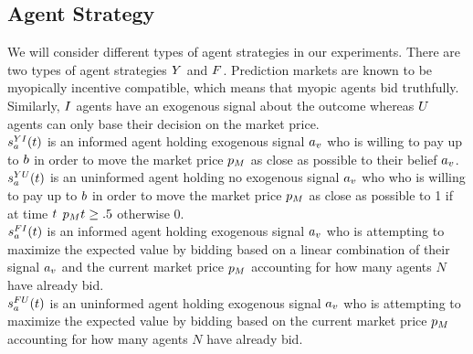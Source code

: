 \subsection{Agent Strategy}
We will consider different types of agent strategies in our experiments. There are two types of agent strategies  $Y$ and  $F$. Prediction markets are known to be myopically incentive compatible, which means that myopic agents bid truthfully. Similarly,  $I$ agents have an exogenous signal about the outcome whereas  $U$ agents can only base their decision on the market price. \\

$s^{YI}_a(t)$ is an informed agent holding exogenous signal $a_v$ who is willing to pay up to $b$ in order to move the market price $p_M$ as close as possible to their belief $a_v$. \\

$s^{YU}_a(t)$ is an uninformed agent holding no exogenous signal $a_v$ who who is willing to pay up to $b$ in order to move the market price $p_M$ as close as possible to 1 if at time $t$ $p_Mt \ge .5$ otherwise 0. \\

$s^{FI}_a(t)$ is an informed agent holding exogenous signal $a_v$ who is attempting to maximize the expected value by bidding based on a linear combination of their signal $a_v$ and the current market price $p_M$ accounting for how many agents $N$ have already bid. \\

$s^{FU}_a(t)$ is an uninformed agent holding exogenous signal $a_v$ who is attempting to maximize the expected value by bidding based on the current market price $p_M$ accounting for how many agents $N$ have already bid. \\
